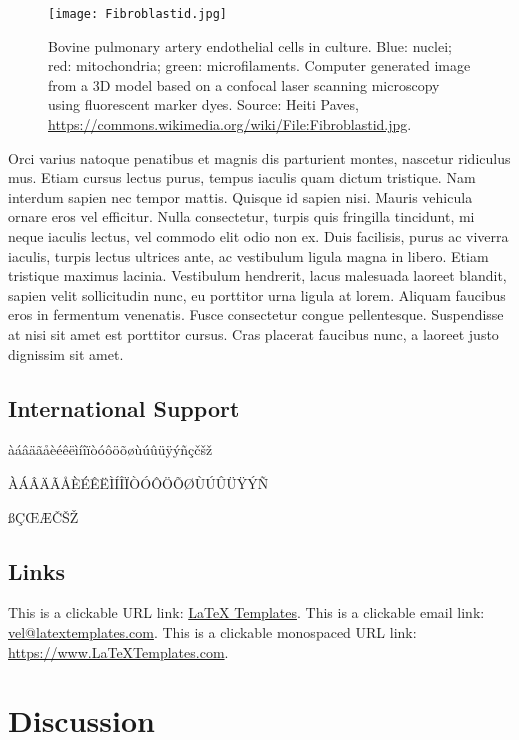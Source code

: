 \documentclass[
	a4paper, %
	12pt, %
	unnumberedsections, %
	twoside, %
]{LTJournalArticle}
\begin{document}
\begin{figure} %
	\texttt{[image: Fibroblastid.jpg]}
	\caption{Bovine pulmonary artery endothelial cells in culture. Blue: nuclei; red: mitochondria; green: microfilaments. Computer generated image from a 3D model based on a confocal laser scanning microscopy using fluorescent marker dyes. Source: Heiti Paves, \href{https://commons.wikimedia.org/wiki/File:Fibroblastid.jpg}{https://commons.wikimedia.org/wiki/File:Fibroblastid.jpg}.}
	\label{fig:bpartery}
\end{figure}

Orci varius natoque penatibus et magnis dis parturient montes, nascetur ridiculus mus. Etiam cursus lectus purus, tempus iaculis quam dictum tristique. Nam interdum sapien nec tempor mattis. Quisque id sapien nisi. Mauris vehicula ornare eros vel efficitur. Nulla consectetur, turpis quis fringilla tincidunt, mi neque iaculis lectus, vel commodo elit odio non ex. Duis facilisis, purus ac viverra iaculis, turpis lectus ultrices ante, ac vestibulum ligula magna in libero. Etiam tristique maximus lacinia. Vestibulum hendrerit, lacus malesuada laoreet blandit, sapien velit sollicitudin nunc, eu porttitor urna ligula at lorem. Aliquam faucibus eros in fermentum venenatis. Fusce consectetur congue pellentesque. Suspendisse at nisi sit amet est porttitor cursus. Cras placerat faucibus nunc, a laoreet justo dignissim sit amet.

\subsection{International Support}

\noindent àáâäãåèéêëìíîïòóôöõøùúûüÿýñçčšž

\noindent ÀÁÂÄÃÅÈÉÊËÌÍÎÏÒÓÔÖÕØÙÚÛÜŸÝÑ

\noindent ßÇŒÆČŠŽ

\subsection{Links}

This is a clickable URL link: \href{https://www.latextemplates.com}{LaTeX Templates}. This is a clickable email link: \href{mailto:vel@latextemplates.com}{vel@latextemplates.com}. This is a clickable monospaced URL link: \url{https://www.LaTeXTemplates.com}.


\section{Discussion}
\end{document}
